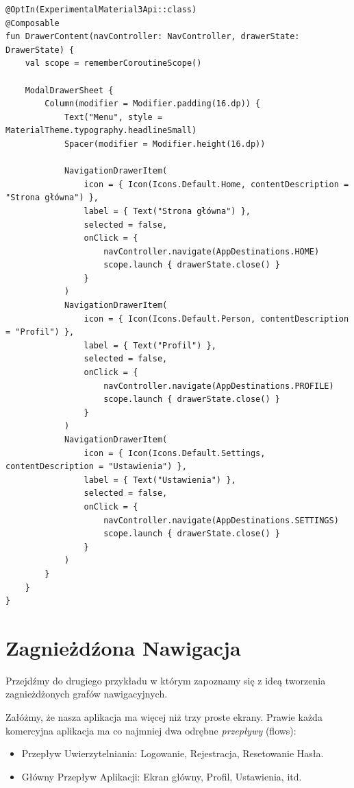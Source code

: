 \begin{verbatim}
@OptIn(ExperimentalMaterial3Api::class)
@Composable
fun DrawerContent(navController: NavController, drawerState: DrawerState) {
    val scope = rememberCoroutineScope()

    ModalDrawerSheet {
        Column(modifier = Modifier.padding(16.dp)) {
            Text("Menu", style = MaterialTheme.typography.headlineSmall)
            Spacer(modifier = Modifier.height(16.dp))

            NavigationDrawerItem(
                icon = { Icon(Icons.Default.Home, contentDescription = "Strona główna") },
                label = { Text("Strona główna") },
                selected = false,
                onClick = {
                    navController.navigate(AppDestinations.HOME)
                    scope.launch { drawerState.close() }
                }
            )
            NavigationDrawerItem(
                icon = { Icon(Icons.Default.Person, contentDescription = "Profil") },
                label = { Text("Profil") },
                selected = false,
                onClick = {
                    navController.navigate(AppDestinations.PROFILE)
                    scope.launch { drawerState.close() }
                }
            )
            NavigationDrawerItem(
                icon = { Icon(Icons.Default.Settings, contentDescription = "Ustawienia") },
                label = { Text("Ustawienia") },
                selected = false,
                onClick = {
                    navController.navigate(AppDestinations.SETTINGS)
                    scope.launch { drawerState.close() }
                }
            )
        }
    }
}
\end{verbatim}

\section{Zagnieżdźona Nawigacja}

Przejdźmy do drugiego przykładu w którym zapoznamy się z ideą tworzenia zagnieżdżonych grafów nawigacyjnych.

Załóżmy, że nasza aplikacja ma więcej niż trzy proste ekrany. Prawie każda komercyjna aplikacja ma co najmniej dwa odrębne \textit{przepływy} (flows):
\begin{itemize}
  \item Przepływ Uwierzytelniania: Logowanie, Rejestracja, Resetowanie Hasła.
  \item Główny Przepływ Aplikacji: Ekran główny, Profil, Ustawienia, itd.
\end{itemize}

